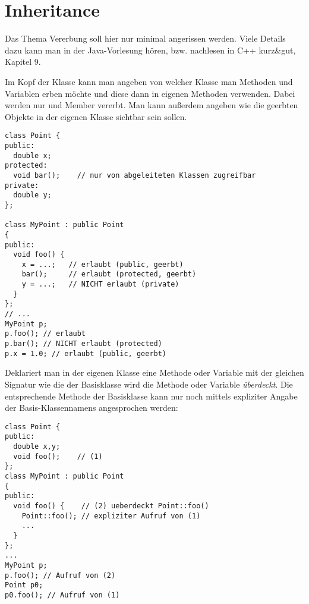 \section{Inheritance\label{sec:vererbung}}
Das Thema Vererbung soll hier nur minimal angerissen werden. Viele Details dazu kann man in der Java-Vorlesung hören, bzw. nachlesen in C++ kurz\&gut, Kapitel 9.

Im Kopf der Klasse kann man angeben von welcher Klasse man Methoden und Variablen erben möchte und diese dann in eigenen Methoden verwenden. Dabei werden nur  und  Member vererbt. Man kann außerdem angeben wie die geerbten Objekte in der eigenen Klasse sichtbar sein sollen.
\begin{verbatim}
class Point {
public:
  double x;
protected:
  void bar();    // nur von abgeleiteten Klassen zugreifbar
private:
  double y;
};

class MyPoint : public Point
{
public:
  void foo() {
    x = ...;   // erlaubt (public, geerbt)
    bar();     // erlaubt (protected, geerbt)
    y = ...;   // NICHT erlaubt (private)
  }
};
// ...
MyPoint p;
p.foo(); // erlaubt
p.bar(); // NICHT erlaubt (protected)
p.x = 1.0; // erlaubt (public, geerbt)
\end{verbatim}

Deklariert man in der eigenen Klasse eine Methode oder Variable mit der gleichen Signatur wie die der Basisklasse wird die Methode oder Variable \emph{überdeckt}. Die entsprechende Methode der Basisklasse kann nur noch mittels expliziter Angabe der Basis-Klassennamens angesprochen werden:
\begin{verbatim}
class Point {
public:
  double x,y;
  void foo();    // (1)
};
class MyPoint : public Point
{
public:
  void foo() {    // (2) ueberdeckt Point::foo()
    Point::foo(); // expliziter Aufruf von (1)
    ...
  }
};
...
MyPoint p;
p.foo(); // Aufruf von (2)
Point p0;
p0.foo(); // Aufruf von (1)
\end{verbatim}
